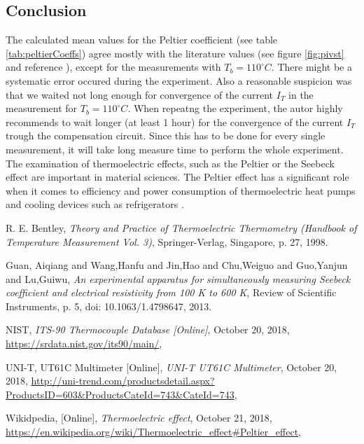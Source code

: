 \documentclass[a4paper]{article}
\begin{document}
\subsection{Conclusion}

The calculated mean values for the Peltier coefficient (see table \ref{tab:peltierCoeffs}) agree mostly with the literature values (see figure \ref{fig:pivst} and reference \cite{guan2013}), except for the measurements with $T_b = 110^{\circ}C$. There might be a systematic error occured during the experiment. 
\newline
Also a reasonable suspicion was that we waited not long enough for convergence of the current $I_T$ in the measurement for $T_b = 110^{\circ}C$. When repeatng the experiment, the autor highly recommends to wait longer (at least 1 hour) for the convergence of the current $I_T$ trough the compensation circuit. Since this has to be done for every single measurement, it will take long measure time to perform the whole experiment.
\newline
The examination of thermoelectric effects, such as the Peltier or the Seebeck effect are important in material sciences. The Peltier effect has a significant role when it comes to efficiency and power consumption of thermoelectric heat pumps and cooling devices such as refrigerators \cite{wiki2018}.

\begin{thebibliography}{9}

  R. E. Bentley,
  \textit{Theory and Practice of Thermoelectric Thermometry (Handbook of Temperature Measurement Vol. 3)},
  Springer-Verlag, Singapore,
  p. 27,
  1998.

  Guan, Aiqiang  and Wang,Hanfu  and Jin,Hao  and Chu,Weiguo  and Guo,Yanjun  and Lu,Guiwu,
  \textit{An experimental apparatus for simultaneously measuring Seebeck coefficient and electrical resistivity from 100 K to 600 K},
  Review of Scientific Instruments,
  p. 5,
  doi: 10.1063/1.4798647,
  2013.

  NIST,
  \textit{ITS-90 Thermocouple Database [Online]},
  October 20, 2018,
  \url{https://srdata.nist.gov/its90/main/},

  UNI-T, UT61C Multimeter [Online],
  \textit{UNI-T UT61C Multimeter},
  October 20, 2018,
  \url{http://uni-trend.com/productsdetail.aspx?ProductsID=603&ProductsCateId=743&CateId=743},

  Wikidpedia, [Online],
  \textit{Thermoelectric effect},
  October 21, 2018,
  \url{https://en.wikipedia.org/wiki/Thermoelectric_effect#Peltier_effect},

\end{thebibliography}
\end{document}
